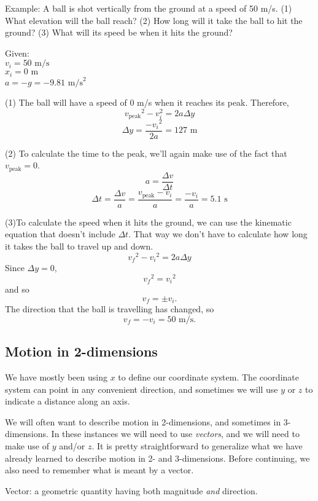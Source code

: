 Example:
A ball is shot vertically from the ground at a speed of 50 m/s. (1) What elevation will the ball reach? (2) How long will it take the ball to hit the ground? (3) What will its speed be when it hits the ground?

Given:\\
$v_i=50\mbox{ m/s}$\\
$x_i=0\mbox{ m}$\\
$a=-g=-9.81\mbox{ m/s}^2$

(1) The ball will have a speed of 0 m/s when it reaches its peak. Therefore,
$$v_{\mbox{peak}}\displaystyle^2-v_i^2=2a\Delta{y}$$
$$\Delta{y}=\frac{-v_i\displaystyle^2}{2a}=127\mbox{ m}$$

(2) To calculate the time to the peak, we'll again make use of the fact that $v_{\mbox{peak}}=0$.
$$a=\frac{\Delta{v}}{\Delta{t}}$$
$$\Delta{t}=\frac{\Delta{v}}{a}=\frac{v_{\mbox{peak}}-v_i}{a}=\frac{-v_i}{a}=5.1\mbox{ s}$$

(3)To calculate the speed when it hits the ground, we can use the kinematic equation that doesn't include $\Delta{t}$. That way we don't have to calculate how long it takes the ball to travel up and down.
$$v_f\displaystyle^2-v_i\displaystyle^2=2a\Delta{y}$$
Since $\Delta{y}=0$,
$$v_f\displaystyle^2=v_i\displaystyle^2$$
and so
$$v_f=\pm v_i.$$
The direction that the ball is travelling has changed, so 
$$v_f=-v_i=50\mbox{ m/s}.$$


\subsection{Motion in 2-dimensions}
We have mostly been using $x$ to define our coordinate system. The coordinate system can point in any convenient direction, and sometimes we will use $y$ or $z$ to indicate a distance along an axis.

We will often want to describe motion in 2-dimensions, and sometimes in 3-dimensions. In these instances we will need to use \textit{vectors}, and we will need to make use of $y$ and/or $z$. It is pretty straightforward to generalize what we have already learned to describe motion in 2- and 3-dimensions. Before continuing, we also need to remember what is meant by a vector.

Vector: a geometric quantity having both magnitude \textit{and} direction.

\vspace{5cm}

